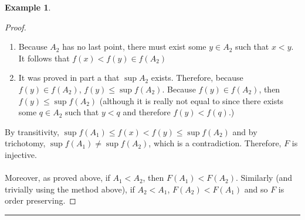 \documentclass[openany, amssymb, psamsfonts]{amsart}
\theoremstyle{definition}
\newtheorem{exmp}{Example}[section]
\numberwithin{equation}{section}
\begin{document}
\begin{exmp}
\begin{enumerate}[(a)]
\begin{proof}
\begin{enumerate}
\item Because $A_2$ has no last point, there must exist some $y\in A_2$ such that $x<y$. It follows that $f(x)<f(y) \in f(A_2)$
\item It was proved in part a that $\sup A_2$ exists. Therefore, because $f(y)\in f(A_2)$, $f(y)\leq \sup f(A_2)$. Because $f(y) \in f(A_2)$, then $f(y) \leq \sup f(A_2)$ (although it is really not equal to since there exists some $q\in A_2$ such that $y<q$ and therefore $f(y)<f(q)$.)
\end{enumerate}
By transitivity, $\sup f(A_1) \leq f(x) < f(y) \leq \sup f(A_2)$ and by trichotomy, $\sup f(A_1) \neq \sup f(A_2)$, which is a contradiction. Therefore, $F$ is injective.\\\\

Moreover, as proved above, if $A_1 < A_2$, then $F(A_1)<F(A_2)$. Similarly (and trivially using the method above), if $A_2<A_1$,  $F(A_2)<F(A_1)$ and so $F$ is order preserving.
\end{proof}\vspace{4pt}     \hrule   \vspace{4pt}
	\end{enumerate}
\end{exmp}
\end{document}
